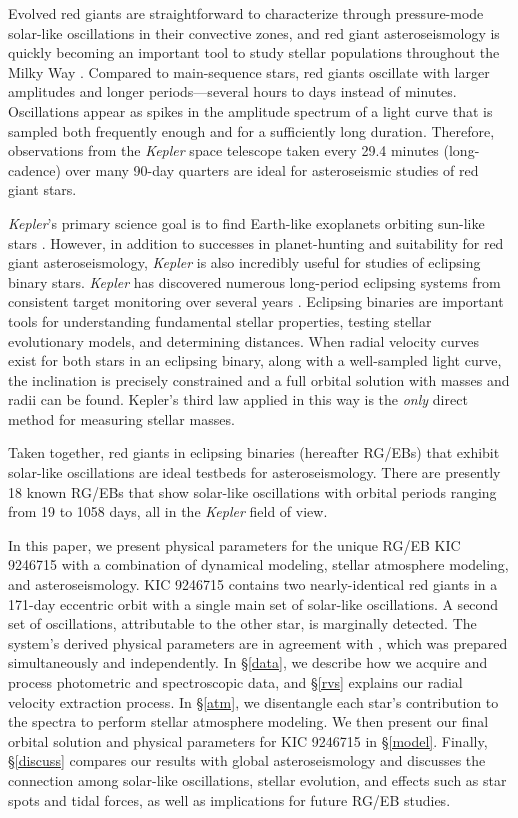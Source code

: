 Evolved red giants are straightforward to characterize through pressure-mode solar-like oscillations in their convective zones, and red giant asteroseismology is quickly becoming an important tool to study stellar populations throughout the Milky Way \citep[for a review of this topic, see][]{cha13}. Compared to main-sequence stars, red giants oscillate with larger amplitudes and longer periods---several hours to days instead of minutes. Oscillations appear as spikes in the amplitude spectrum of a light curve that is sampled both frequently enough and for a sufficiently long duration. Therefore, observations from the \emph{Kepler} space telescope taken every 29.4 minutes (long-cadence) over many 90-day quarters are ideal for asteroseismic studies of red giant stars.

\emph{Kepler}'s primary science goal is to find Earth-like exoplanets orbiting sun-like stars \citep{bor10}. However, in addition to successes in planet-hunting and suitability for red giant asteroseismology, \emph{Kepler} is also incredibly useful for studies of eclipsing binary stars. \emph{Kepler} has discovered numerous long-period eclipsing systems from consistent target monitoring over several years \citep{prs11,sla11}. Eclipsing binaries are important tools for understanding fundamental stellar properties, testing stellar evolutionary models, and determining distances. When radial velocity curves exist for both stars in an eclipsing binary, along with a well-sampled light curve, the inclination is precisely constrained and a full orbital solution with masses and radii can be found. Kepler's third law applied in this way is the \emph{only} direct method for measuring stellar masses.

Taken together, red giants in eclipsing binaries (hereafter RG/EBs) that exhibit solar-like oscillations are ideal testbeds for asteroseismology. There are presently 18 known RG/EBs that show solar-like oscillations \citep{hek10,gau13,gau14,bec14,bec15} with orbital periods ranging from 19 to 1058 days, all in the \emph{Kepler} field of view.

In this paper, we present physical parameters for the unique RG/EB KIC 9246715 with a combination of dynamical modeling, stellar atmosphere modeling, and asteroseismology. KIC 9246715 contains two nearly-identical red giants in a 171-day eccentric orbit with a single main set of solar-like oscillations. A second set of oscillations,  attributable to the other star, is marginally detected. The system's derived physical parameters are in agreement with \citet{hel15}, which was prepared simultaneously and independently. In \S \ref{data}, we describe how we acquire and process photometric and spectroscopic data, and \S \ref{rvs} explains our radial velocity extraction process. In \S \ref{atm}, we disentangle each star's contribution to the spectra to perform stellar atmosphere modeling. We then present our final orbital solution and physical parameters for KIC 9246715 in \S \ref{model}. Finally, \S \ref{discuss} compares our results with global asteroseismology and discusses the connection among solar-like oscillations, stellar evolution, and effects such as star spots and tidal forces, as well as implications for future RG/EB studies.

  
  
  